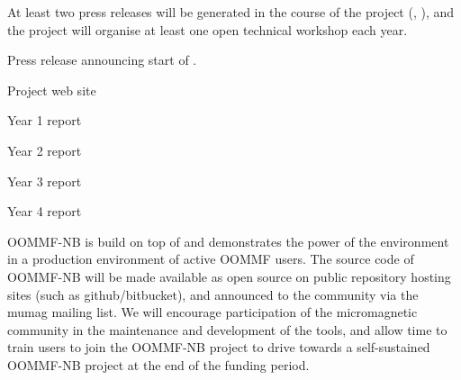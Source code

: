\begin{workpackage}[id=dissem,wphases=18-48!.5,
  title=Dissemination,
  SARM=1,
  USORM=7]
\begin{tasklist}
\begin{task}[title=Dissemination and Communication activities]

  At least two press releases will be generated in the course of the
  project (, ), and
  the project will organise at least one open technical workshop each
  year. %
\end{task}
\end{tasklist}

\begin{wpdelivs}
  \begin{wpdeliv}[due=3,id=pressrelease,dissem=??,nature=??]
      {Press release announcing start of \TheProject.}
\end{wpdeliv}%
  \begin{wpdeliv}[due=3,id=website,dissem=??,nature=??]
      {Project web site}
\end{wpdeliv}%
  \begin{wpdeliv}[due=12,id=periodic-rep-1,dissem=??,nature=??]
      {Year 1 report}
\end{wpdeliv}%
  \begin{wpdeliv}[due=24,id=periodic-rep-2,dissem=??,nature=??]
      {Year 2 report}
\end{wpdeliv}%
  \begin{wpdeliv}[due=36,id=periodic-rep-3,dissem=??,nature=??]
      {Year 3 report}
\end{wpdeliv}%
  \begin{wpdeliv}[due=48,id=periodic-rep-4,dissem=??,nature=??]
      {Year 4 report}
\end{wpdeliv}%
\end{wpdelivs}

\begin{tasklist}
\begin{task}[id=dissemination-of-oommf-nb-virtual-environment,
  title=Dissemination of OOMMF-NB virtual environment]
  OOMMF-NB is build on top of \TheProject and demonstrates the power
  of the environment in a production environment of active OOMMF users. 
  The source code of OOMMF-NB will be made available as open source on
  public repository hosting sites (such as github/bitbucket), and
  announced to the community via the mumag mailing list. We will
  encourage participation of the micromagnetic community in the
  maintenance and development of the tools, and allow time to train
  users to join the OOMMF-NB project to drive towards a self-sustained
  OOMMF-NB project at the end of the funding period.


\end{task}
\end{tasklist}
\end{workpackage}
